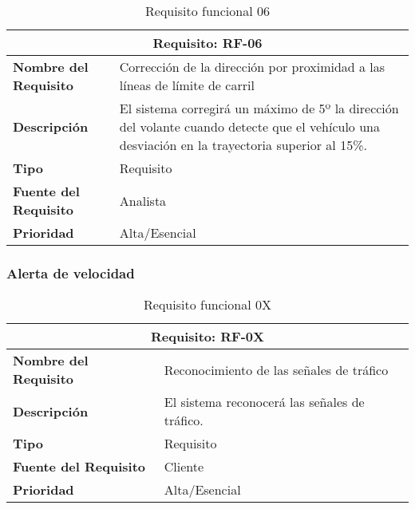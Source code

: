 \begin{table}[H]
\begin{center}
\begin{tabular}{p{} p{7cm}}
\multicolumn{2}{c}{\textbf{Requisito: RF-06} } \\
\hline \hline
\textbf{Nombre del Requisito} &  Corrección de la dirección por proximidad a las líneas de límite de carril\\
\hline
\textbf{Descripción} & El sistema corregirá un máximo de 5º la dirección del volante cuando detecte que el vehículo una desviación en la trayectoria superior al 15\%. \\
\hline
\textbf{Tipo} & Requisito  \\
\hline
\textbf{Fuente del Requisito} & Analista  \\
\hline
\textbf{Prioridad} & Alta/Esencial  \\ \hline
\end{tabular}
\caption{Requisito funcional 06}
\label{tab:RF-06}
\end{center}
\end{table}


\subsubsection{Alerta de velocidad}

\begin{table}[H]
\begin{center}
\begin{tabular}{p{} p{7cm}}
\multicolumn{2}{c}{\textbf{Requisito: RF-0X} } \\
\hline \hline
\textbf{Nombre del Requisito} & Reconocimiento de las señales de tráfico \\
\hline
\textbf{Descripción} & El sistema reconocerá las señales de tráfico. \\
\hline
\textbf{Tipo} & Requisito  \\
\hline
\textbf{Fuente del Requisito} & Cliente  \\
\hline
\textbf{Prioridad} & Alta/Esencial  \\ \hline
\end{tabular}
\caption{Requisito funcional 0X}
\label{tab:personal}
\end{center}
\end{table}


